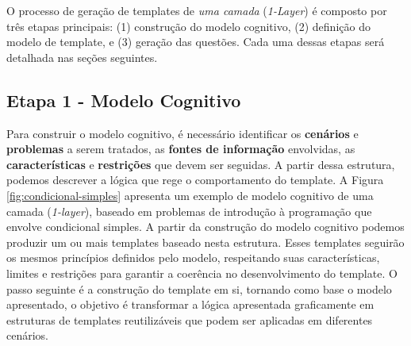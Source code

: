 O processo de geração de templates de \textit{uma camada} (\textit{1-Layer})  é composto por três etapas principais: (1) construção do modelo cognitivo, (2) definição do modelo de template, e (3) geração das questões. Cada uma dessas etapas será detalhada nas seções seguintes. 

\subsection{Etapa 1 - Modelo Cognitivo }

Para construir o modelo cognitivo, é necessário identificar os \textbf{cenários} e \textbf{problemas} a serem tratados, as \textbf{fontes de informação} envolvidas, as \textbf{características} e \textbf{restrições} que devem ser seguidas. A partir dessa estrutura, podemos descrever a lógica que rege o comportamento do template. A Figura \ref{fig:condicional-simples}  apresenta um exemplo de modelo cognitivo de uma camada (\textit{1-layer}), baseado em problemas de introdução à programação que envolve condicional simples.  A partir da construção do modelo cognitivo podemos produzir um ou mais templates baseado nesta estrutura. Esses templates seguirão os mesmos princípios definidos pelo modelo, respeitando suas características, limites e restrições para garantir a coerência no desenvolvimento do template.  O passo seguinte é a construção do template em si, tornando como base o modelo apresentado, o objetivo é transformar a lógica apresentada graficamente em estruturas de templates reutilizáveis que podem ser aplicadas em diferentes cenários. 
